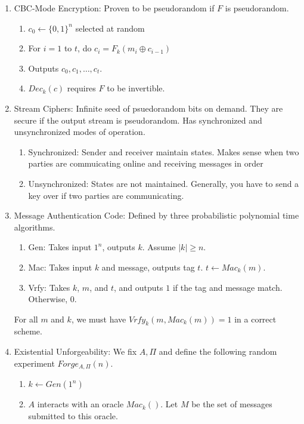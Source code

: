 \documentclass[12pt,letterpaper]{article}
\begin{document}
\begin{enumerate}
    \item CBC-Mode Encryption: Proven to be pseudorandom if $F$ is pseudorandom.
        \begin{enumerate}
            \item $c_0\leftarrow\{0,1\}^n$ selected at random
            \item For $i=1$ to $t$, do $c_i=F_k(m_i\oplus c_{i-1})$
            \item Outputs $c_0,c_1,\ldots,c_t$.
            \item $Dec_k(c)$ requires $F$ to be invertible. 
        \end{enumerate}
    \item Stream Ciphers: Infinite seed of psuedorandom bits on demand. They are secure if the output stream is pseudorandom. Has synchronized and unsynchronized modes of operation.
        \begin{enumerate}
            \item Synchronized: Sender and receiver maintain states. Makes sense when two parties are commuicating online and receiving messages in order
            \item Unsynchronized: States are not maintained. Generally, you have to send a key over if two parties are communicating.
        \end{enumerate}
        \item Message Authentication Code: Defined by three probabilistic polynomial time algorithms.
            \begin{enumerate}
                \item Gen: Takes input $1^n$, outputs $k$. Assume $|k|\geq n$.
                \item Mac: Takes input $k$ and message, outputs tag $t$. $t\leftarrow Mac_k(m)$.
                \item Vrfy: Takes $k$, $m$, and $t$, and outputs $1$ if the tag and message match. Otherwise, $0$.
            \end{enumerate}
                    For all $m$ and $k$, we must have $Vrfy_k(m,Mac_k(m))=1$ in a correct scheme.\newpage
                \item Existential Unforgeability: We fix $A,\Pi$ and define the following random experiment $Forge_{A,\Pi}(n)$.
            \begin{enumerate}
                \item $k\leftarrow Gen(1^n)$
                \item $A$ interacts with an oracle $Mac_k()$. Let $M$ be the set of messages submitted to this oracle.

\end{enumerate}
\end{enumerate}
\end{document}
